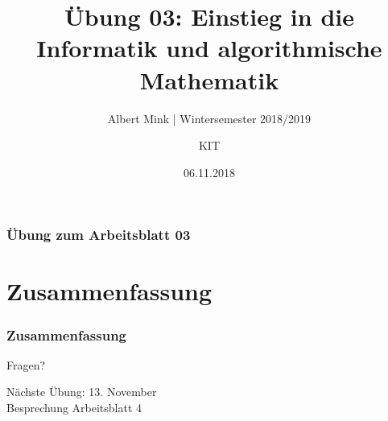 \documentclass[c,18pt]{beamer}
\date{06.11.2018}
\title[Übung 03: Einstieg in die Informatik und algorithmische Mathematik]
  {Übung 03: Einstieg in die Informatik und algorithmische Mathematik}
\subtitle{Albert Mink | Wintersemester 2018/2019}
\author[Albert Mink, ]{KIT}
\institute[Institut für Angewandte und Numerische Mathematik (IANM)]{Institut für Angewandte und Numerische Mathematik}
\begin{document}
\begin{frame}
  \maketitle
\end{frame}


\begin{frame}
  \frametitle{Übung zum Arbeitsblatt 03}%
\tableofcontents
\end{frame}



\def\kap{1}

\setcounter{exercise}{8}

\setcounter{exercise}{9}
\setcounter{exercise}{10}

\def\kap{2}
\setcounter{exercise}{11}
\def\kap{3}
\setcounter{exercise}{12}

\section{Zusammenfassung}
\begin{frame}
  \frametitle{Zusammenfassung}%
\tableofcontents[hideallsubsections]
\end{frame}

\begin{frame}
\centering
\Huge\textcolor{KITgreen}{Fragen?}
\vspace{2cm}

{\LARGE
Nächste Übung: 13. November\\
Besprechung Arbeitsblatt 4
}
\end{frame}


\end{document}
